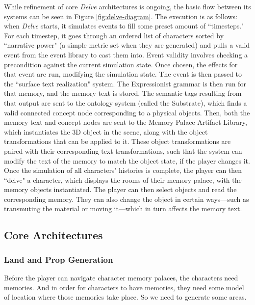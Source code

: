 While refinement of core \textit{Delve} architectures is ongoing, the basic flow between its systems can be seen in Figure \ref{fig:delve-diagram}. The execution is as follows: when \textit{Delve} starts, it simulates events to fill some preset amount of ``timesteps." For each timestep, it goes through an ordered list of characters sorted by ``narrative power" (a simple metric set when they are generated) and pulls a valid event from the event library to cast them into. Event validity involves checking a precondition against the current simulation state. Once chosen, the effects for that event are run, modifying the simulation state. The event is then passed to the ``surface text realization" system. The Expressionist grammar is then run for that memory, and the memory text is stored. The semantic tags resulting from that output are sent to the ontology system (called the Substrate), which finds a valid connected concept node corresponding to a physical objects. Then, both the memory text and concept nodes are sent to the Memory Palace Artifact Library, which instantiates the 3D object in the scene, along with the object transformations that can be applied to it. These object transformations are paired with their corresponding text transformations, such that the system can modify the text of the memory to match the object state, if the player changes it.
Once the simulation of all characters' histories is complete, the player can then ``delve" a character, which displays the rooms of their memory palace, with the memory objects instantiated. The player can then select objects and read the corresponding memory. They can also change the object in certain ways---such as transmuting the material or moving it---which in turn affects the memory text.

\subsection{Core Architectures}\label{subsec:delve-core-architectures}

\subsubsection{Land and Prop Generation}\label{subsubsec:land-and-prop-generation}

Before the player can navigate character memory palaces, the characters need memories. And in order for characters to have memories, they need some model of location where those memories take place. So we need to generate some areas.

